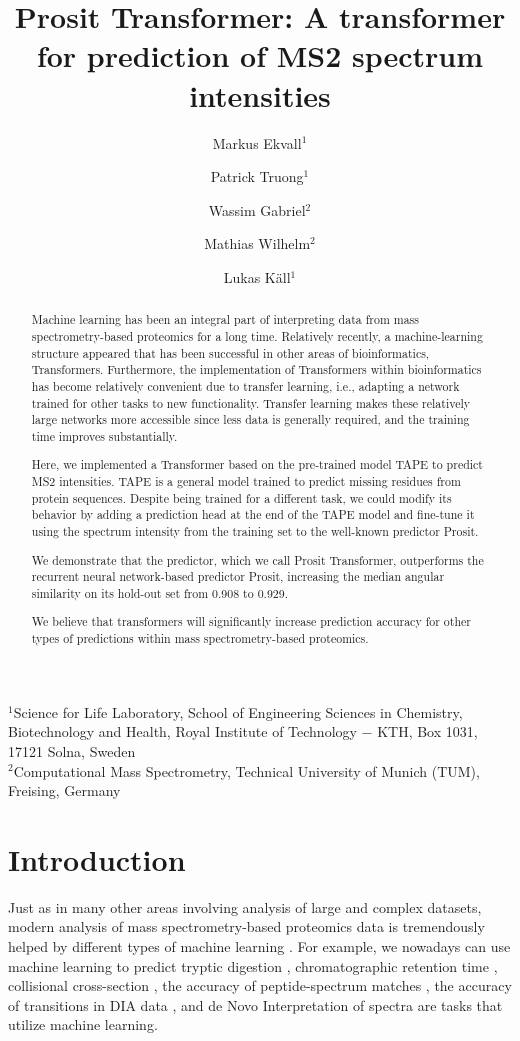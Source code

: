 \documentclass[10pt,a4paper]{article}
\title{Prosit Transformer: A transformer for prediction of MS2 spectrum intensities}
\author{Markus Ekvall$^1$ \and Patrick Truong$^1$ \and Wassim Gabriel$^2$ \and Mathias Wilhelm$^2$ \and Lukas K\"{a}ll$^1$}
\begin{document}
\maketitle
$^1$Science for Life Laboratory, School of Engineering Sciences in Chemistry, Biotechnology and Health, Royal Institute of Technology − KTH, Box 1031, 17121 Solna, Sweden\\
$^2$Computational Mass Spectrometry, Technical University of Munich (TUM), Freising, Germany

\begin{abstract}
Machine learning has been an integral part of interpreting data from mass spectrometry-based proteomics for a long time. Relatively recently, a machine-learning structure appeared that has been successful in other areas of bioinformatics, Transformers. Furthermore, the implementation of Transformers within bioinformatics has become relatively convenient due to transfer learning, i.e., adapting a network trained for other tasks to new functionality. Transfer learning makes these relatively large networks more accessible since less data is generally required, and the training time improves substantially.

Here, we implemented a Transformer based on the pre-trained model TAPE to predict MS2 intensities. TAPE is a general model trained to predict missing residues from protein sequences. Despite being trained for a different task, we could modify its behavior by adding a prediction head at the end of the TAPE model and fine-tune it using the spectrum intensity from the training set to the well-known predictor Prosit.

We demonstrate that the predictor, which we call Prosit Transformer, outperforms the recurrent neural network-based predictor Prosit, increasing the median angular similarity on its hold-out set from 0.908 to 0.929.

We believe that transformers will significantly increase prediction accuracy for other types of predictions within mass spectrometry-based proteomics.
\end{abstract}


\section*{Introduction}
Just as in many other areas involving analysis of large and complex datasets, modern analysis of mass spectrometry-based proteomics data is tremendously helped by different types of machine learning \cite{Meyer2021-hc,Mann2021-kx}. For example, we nowadays can use machine learning to predict tryptic digestion \cite{Yang2021-ng}, chromatographic retention time \cite{Moruz2010-ls,Ma2018-wy,Martens_undated-vs}, collisional cross-section \cite{Meier2021-ur}, the accuracy of peptide-spectrum matches \cite{Kall2007-ll}, the accuracy of transitions in DIA data \cite{Demichev2020-zd}, and de Novo Interpretation of spectra \cite{Tran2017-lk} are tasks that utilize machine learning.
\end{document}
